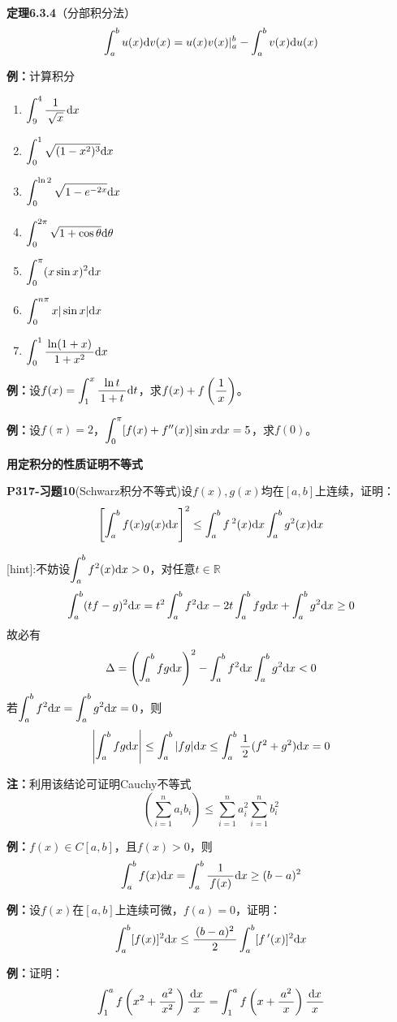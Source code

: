 {\bf 定理6.3.4}（分部积分法）
$${\dint_a^bu(x)\d v(x)=u(x)v(x)|_a^b-\dint_a^bv(x)\d u(x)}$$

{\bf 例：}计算积分
\begin{enumerate}[(1)]
  \setlength{\itemindent}{1cm}
  \item  $\dint_9^4\df 1{\sqrt x}\d x$ 
  \item $\dint_0^1\sqrt{(1-x^2)^3}\d x$ 
  \item $\dint_0^{\ln 2}\sqrt{1-e^{-2x}}\d x$
  \item $\dint_0^{2\pi}\sqrt{1+\cos\theta}\d\theta$ 
  \item $\dint_0^{\pi}(x\sin x)^2\d x$ 
  \item $\dint_0^{n\pi}x|\sin x|\d x$ 
  \item $\dint_0^1\df{\ln(1+x)}{1+x^2}\d x$
\end{enumerate}

{\bf 例：}设$f(x)=\dint_1^x\df{\ln t}{1+t}\d t$，求$f(x)+f
\left(\df1x\right)$。

{\bf 例：}设$f(\pi)=2$，$\dint_0^{\pi}[f(x)+f''(x)]\sin x\d x=5$，求$f(0)$。

\begin{shaded}
	{\bf 用定积分的性质证明不等式}
	
	{\bf P317-习题10}(Schwarz积分不等式)设$f(x),g(x)$均在$[a,b]$上连续，证明：
	$$\left[\dint_a^bf(x)g(x)\d x\right]^2
	\leq\dint_a^bf\,^2(x)\d x\dint_a^bg^2(x)\d x$$
	
	[hint]:不妨设$\dint_a^bf^2(x)\d x>0$，对任意$t\in\mathbb{R}$
	$$\dint_a^b(tf-g)^2\d x=t^2\dint_a^bf^2\d x-2t\dint_a^bfg\d x
	+\dint_a^bg^2\d x\geq 0$$
	故必有
	$$\Delta=\left(\dint_a^bfg\d x\right)^2-\dint_a^bf^2\d x\dint_a^b
	g^2\d x<0$$
	若$\dint_a^bf^2\d x=\dint_a^b g^2\d x=0$，则
	$$\left|\dint_a^bfg\d x\right|\leq\dint_a^b|fg|\d x
	\leq\dint_a^b\df12(f^2+g^2)\d x=0$$
	
	{\bf 注：}利用该结论可证明Cauchy不等式
	$$\left(\sum\limits_{i=1}^na_ib_i\right)\leq
	\sum\limits_{i=1}^na_i^2\sum\limits_{i=1}^nb_i^2$$
	
	{\bf 例：}$f(x)\in C[a,b]$，且$f(x)>0$，则
	$$\dint_a^bf(x)\d x=\dint_a^b\df1{f(x)}\d x\geq(b-a)^2$$
	
	{\bf 例：}设$f(x)$在$[a,b]$上连续可微，$f(a)=0$，证明：
	$$\dint_a^b[f(x)]^2\d x\leq\df{(b-a)^2}{2}\dint_a^b[f\,'(x)]^2\d x$$
\end{shaded}

{\bf 例：}证明：
$$\dint_1^af\left(x^2+\df{a^2}{x^2}\right)\df{\d x}{x}
=\dint_1^af\left(x+\df{a^2}{x}\right)\df{\d x}{x}$$

